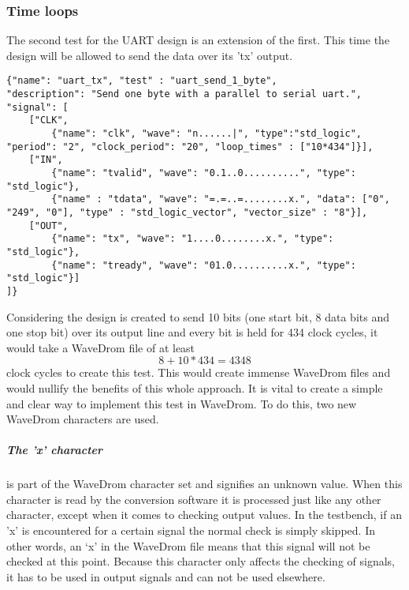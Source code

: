 \subsubsection{Time loops}
The second test for the UART design is an extension of the first. This time the design will be allowed to send the data over its 'tx' output.
\begin{lstlisting}[style=json, caption={Source file for creating a second transmission test for the UART design in \ref{appendix:uart}}, label={json:uart_wait}]
{"name": "uart_tx", "test" : "uart_send_1_byte", 
"description": "Send one byte with a parallel to serial uart.", 
"signal": [
	["CLK",
		{"name": "clk", "wave": "n......|", "type":"std_logic", "period": "2", "clock_period": "20", "loop_times" : ["10*434"]}],
	["IN",
		{"name": "tvalid", "wave": "0.1..0..........", "type": "std_logic"},
		{"name" : "tdata", "wave": "=.=..=........x.", "data": ["0", "249", "0"], "type" : "std_logic_vector", "vector_size" : "8"}],
	["OUT",
		{"name": "tx", "wave": "1....0........x.", "type": "std_logic"},
		{"name": "tready", "wave": "01.0..........x.", "type": "std_logic"}]
]}
\end{lstlisting}\noindent
{}\newpage\noindent
Considering the design is created to send 10 bits (one start bit, 8 data bits and one stop bit) over its output line and every bit is held for 434 clock cycles, it would take a WaveDrom file of at least
\begin{equation}
	8 + 10 * 434 = 4348
\end{equation}
clock cycles to create this test. This would create immense WaveDrom files and would nullify the benefits of this whole approach. It is vital to create a simple and clear way to implement this test in WaveDrom. To do this, two new WaveDrom characters are used.
\subparagraph{The 'x' character} is part of the WaveDrom character set and signifies an unknown value. When this character is read by the conversion software it is processed just like any other character, except when it comes to checking output values. In the testbench, if an 'x' is encountered for a certain signal the normal check is simply skipped. In other words, an ‘x’ in the WaveDrom file means that this signal will not be checked at this point. Because this character only affects the checking of signals, it has to be used in output signals and can not be used elsewhere.


